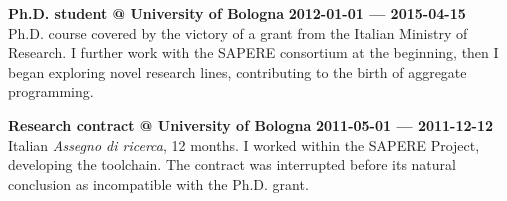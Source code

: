 \textbf{Ph.D. student @ University of Bologna} \hfill \textbf{2012-01-01 --- 2015-04-15}\\
Ph.D. course covered by the victory of a grant from the Italian Ministry of Research.
I further work with the SAPERE consortium at the beginning, then I began exploring novel research lines, contributing to the birth of aggregate programming.

\halfblankline{}

\textbf{Research contract @ University of Bologna} \hfill \textbf{2011-05-01 --- 2011-12-12}\\
Italian \emph{Assegno di ricerca}, 12 months.
I worked within the SAPERE Project, developing the toolchain.
The contract was interrupted before its natural conclusion as incompatible with the Ph.D. grant.
